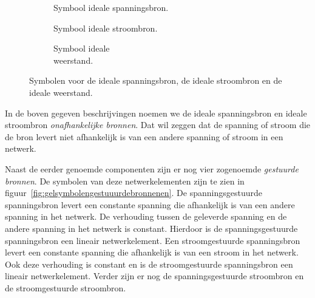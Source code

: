 \begin{figure}[!ht]
\centering
\begin{subfigure}{0.30\textwidth}
\centering
{}
\caption{Symbool ideale spanningsbron.}
\end{subfigure}
\begin{subfigure}{0.30\textwidth}
\centering
{}
\caption{Symbool ideale stroombron.}
\end{subfigure}
\begin{subfigure}{0.30\textwidth}
\centering
{}
\caption{Symbool ideale\\ weerstand.}
\end{subfigure}
\caption{Symbolen voor de ideale spanningsbron, de ideale stroombron en de ideale weerstand.}
\label{fig:gelsymbolenbronnenenweerstand}
\end{figure}

In de boven gegeven beschrijvingen noemen we de ideale spanningsbron en ideale stroombron
\textsl{onafhankelijke bronnen}. Dat wil zeggen dat de spanning of stroom die de bron
levert niet afhankelijk is van een andere spanning of stroom in een netwerk.

Naast de eerder genoemde componenten zijn er nog vier zogenoemde \textsl{gestuurde bronnen}.
De symbolen van deze netwerkelementen zijn te zien in figuur~\ref{fig:gelsymbolengestuuurdebronnenen}.
De spanningsgestuurde spanningsbron levert een constante spanning die afhankelijk is van een
andere spanning in het netwerk. De verhouding tussen de geleverde spanning en de andere spanning
in het netwerk is constant. Hierdoor is de spanningsgestuurde spanningsbron een lineair netwerkelement.
Een stroomgestuurde spanningsbron levert een constante spanning die afhankelijk is van een stroom in
het netwerk. Ook deze verhouding is constant en is de stroomgestuurde spanningsbron een lineair
netwerkelement. Verder zijn er nog de spanningsgestuurde stroombron en de stroomgestuurde stroombron.

